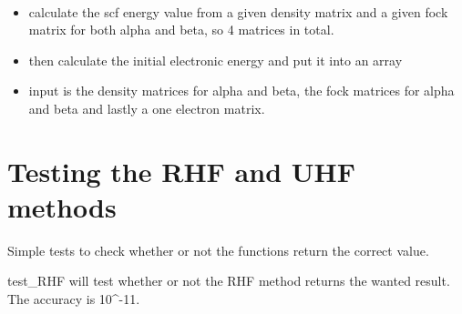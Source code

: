\documentclass[letterpaper,10pt,english]{sphinxmanual}
\begin{document}

\begin{fulllineitems}
\label{\detokenize{SCF_functions:ghf.SCF_functions.uhf_scf_energy}}~\begin{itemize}
\item {} 
calculate the scf energy value from a given density matrix and a given fock matrix for both alpha and beta,
so 4 matrices in total.

\item {} 
then calculate the initial electronic energy and put it into an array

\item {} 
input is the density matrices for alpha and beta, the fock matrices for alpha and beta and lastly a one electron
matrix.

\end{itemize}

\end{fulllineitems}

\label{\detokenize{tests:module-ghf.tests.test_auth}}

\chapter{Testing the RHF and UHF methods}
\label{\detokenize{tests:testing-the-rhf-and-uhf-methods}}\label{\detokenize{tests::doc}}
Simple tests to check whether or not the functions return the correct value.

\begin{fulllineitems}
\label{\detokenize{tests:ghf.tests.test_auth.test_RHF}}
test\_RHF will test whether or not the RHF method returns the wanted result. The accuracy is 10\textasciicircum{}-11.

\end{fulllineitems}
\end{document}
